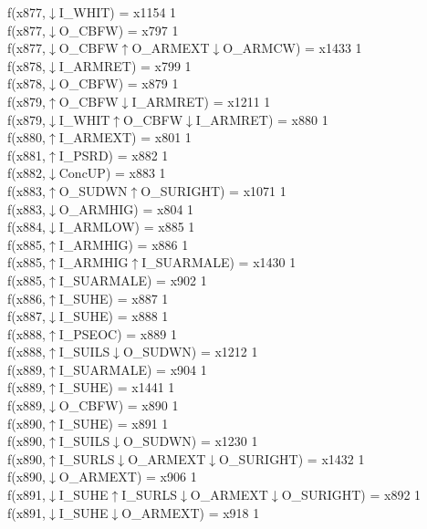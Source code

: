f(x877,$\downarrow$I\_WHIT) = x1154 {1} \\
f(x877,$\downarrow$O\_CBFW) = x797 {1} \\
f(x877,$\downarrow$O\_CBFW$\uparrow$O\_ARMEXT$\downarrow$O\_ARMCW) = x1433 {1} \\
f(x878,$\downarrow$I\_ARMRET) = x799 {1} \\
f(x878,$\downarrow$O\_CBFW) = x879 {1} \\
f(x879,$\uparrow$O\_CBFW$\downarrow$I\_ARMRET) = x1211 {1} \\
f(x879,$\downarrow$I\_WHIT$\uparrow$O\_CBFW$\downarrow$I\_ARMRET) = x880 {1} \\
f(x880,$\uparrow$I\_ARMEXT) = x801 {1} \\
f(x881,$\uparrow$I\_PSRD) = x882 {1} \\
f(x882,$\downarrow$ConcUP) = x883 {1} \\
f(x883,$\uparrow$O\_SUDWN$\uparrow$O\_SURIGHT) = x1071 {1} \\
f(x883,$\downarrow$O\_ARMHIG) = x804 {1} \\
f(x884,$\downarrow$I\_ARMLOW) = x885 {1} \\
f(x885,$\uparrow$I\_ARMHIG) = x886 {1} \\
f(x885,$\uparrow$I\_ARMHIG$\uparrow$I\_SUARMALE) = x1430 {1} \\
f(x885,$\uparrow$I\_SUARMALE) = x902 {1} \\
f(x886,$\uparrow$I\_SUHE) = x887 {1} \\
f(x887,$\downarrow$I\_SUHE) = x888 {1} \\
f(x888,$\uparrow$I\_PSEOC) = x889 {1} \\
f(x888,$\uparrow$I\_SUILS$\downarrow$O\_SUDWN) = x1212 {1} \\
f(x889,$\uparrow$I\_SUARMALE) = x904 {1} \\
f(x889,$\uparrow$I\_SUHE) = x1441 {1} \\
f(x889,$\downarrow$O\_CBFW) = x890 {1} \\
f(x890,$\uparrow$I\_SUHE) = x891 {1} \\
f(x890,$\uparrow$I\_SUILS$\downarrow$O\_SUDWN) = x1230 {1} \\
f(x890,$\uparrow$I\_SURLS$\downarrow$O\_ARMEXT$\downarrow$O\_SURIGHT) = x1432 {1} \\
f(x890,$\downarrow$O\_ARMEXT) = x906 {1} \\
f(x891,$\downarrow$I\_SUHE$\uparrow$I\_SURLS$\downarrow$O\_ARMEXT$\downarrow$O\_SURIGHT) = x892 {1} \\
f(x891,$\downarrow$I\_SUHE$\downarrow$O\_ARMEXT) = x918 {1} \\
